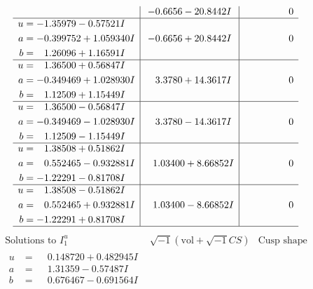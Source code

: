 \documentclass[1p]{elsarticle_modified}
\theoremstyle{definition}
\newcommand{\I}{\sqrt{-1}}
\begin{document}
$$\begin{array}{c|c|c}
 & -0.6656 - 20.8442 I & \phantom{-0.000000 } 0 \\ \hline\begin{aligned}
u &= -1.35979 - 0.57521 I \\
a &= -0.399752 + 1.059340 I \\
b &= \phantom{-}1.26096 + 1.16591 I\end{aligned}
 & -0.6656 + 20.8442 I & \phantom{-0.000000 } 0 \\ \hline\begin{aligned}
u &= \phantom{-}1.36500 + 0.56847 I \\
a &= -0.349469 + 1.028930 I \\
b &= \phantom{-}1.12509 + 1.15449 I\end{aligned}
 & \phantom{-}3.3780 + 14.3617 I & \phantom{-0.000000 } 0 \\ \hline\begin{aligned}
u &= \phantom{-}1.36500 - 0.56847 I \\
a &= -0.349469 - 1.028930 I \\
b &= \phantom{-}1.12509 - 1.15449 I\end{aligned}
 & \phantom{-}3.3780 - 14.3617 I & \phantom{-0.000000 } 0 \\ \hline\begin{aligned}
u &= \phantom{-}1.38508 + 0.51862 I \\
a &= \phantom{-}0.552465 - 0.932881 I \\
b &= -1.22291 - 0.81708 I\end{aligned}
 & \phantom{-}1.03400 + 8.66852 I & \phantom{-0.000000 } 0 \\ \hline\begin{aligned}
u &= \phantom{-}1.38508 - 0.51862 I \\
a &= \phantom{-}0.552465 + 0.932881 I \\
b &= -1.22291 + 0.81708 I\end{aligned}
 & \phantom{-}1.03400 - 8.66852 I & \phantom{-0.000000 } 0\\
 \hline 
 \end{array}$$\newpage$$\begin{array}{c|c|c}  
\text{Solutions to }I^u_{1}& \I (\text{vol} + \sqrt{-1}CS) & \text{Cusp shape}\\
 \hline 
\begin{aligned}
u &= \phantom{-}0.148720 + 0.482945 I \\
a &= \phantom{-}1.31359 - 0.57487 I \\
b &= \phantom{-}0.676467 - 0.691564 I\end{aligned}

\end{array}$$
\end{document}
